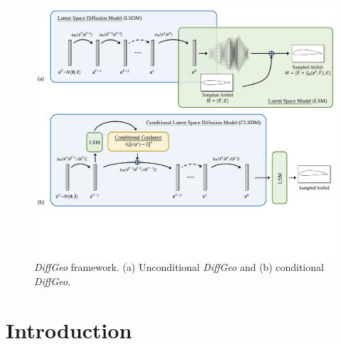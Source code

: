 \begin{figure}[tbh]
    \begin{center}
        \includegraphics[width=1\linewidth]{chapter6/fig/framework.pdf}
    \end{center}
    \vspace{-4mm}
    \caption{
        \small \textit{DiffGeo} framework. (a) Unconditional \textit{DiffGeo} and (b) conditional \textit{DiffGeo}.
    }
    \label{ch6:fig:abs_framework}
\end{figure}

\section{Introduction}

